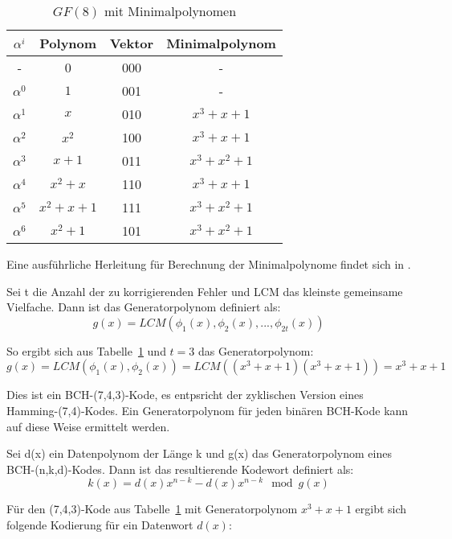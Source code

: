 \begin{table}[!h]
\begin{center}
\begin{tabular}{c|c|c|c}
$\alpha^i$ & Polynom & Vektor & Minimalpolynom\\
\hline
- & 0 & 000 & - \\
$\alpha^0$ & $1$ & 001 & - \\
$\alpha^1$ & $x$ & 010 & $x^3+x+1$ \\
$\alpha^2$ & $x^2$ & 100  & $x^3+x+1$ \\
$\alpha^3$ & $x+1$ & 011  & $x^3+x^2+1$ \\
$\alpha^4$ & $x^2+x$ & 110  & $x^3+x+1$ \\
$\alpha^5$ & $x^2+x+1$ & 111  & $x^3+x^2+1$ \\
$\alpha^6$ & $x^2+1$ & 101  & $x^3+x^2+1$  \\
\end{tabular}
\caption{$GF(8)$ mit Minimalpolynomen}
\label{table:minimals}
\end{center}
\end{table}

Eine ausführliche Herleitung für Berechnung der Minimalpolynome findet sich in \cite[Kap. 3.2.1]{morelos2006art}.

\begin{t_def}
\label{def:genpoly}
Sei t die Anzahl der zu korrigierenden Fehler und LCM das kleinste gemeinsame Vielfache. Dann ist das Generatorpolynom definiert als:
$$g(x) = LCM(\phi_1(x),\phi_2(x),...,\phi_{2t}(x))$$
\end{t_def}

So ergibt sich aus Tabelle~\ref{table:minimals} und $t=3$ das Generatorpolynom:
$$g(x) = LCM(\phi_1(x),\phi_2(x)) = LCM((x^3+x+1)(x^3+x+1)) = x^3+x+1$$

Dies ist ein BCH-(7,4,3)-Kode, es entpsricht der zyklischen Version eines Hamming-(7,4)-Kodes. Ein Generatorpolynom für jeden binären BCH-Kode kann auf diese Weise ermittelt werden.

\begin{t_def}
\label{def:encode}
Sei d(x) ein Datenpolynom der Länge k und g(x) das Generatorpolynom eines BCH-(n,k,d)-Kodes. Dann ist das resultierende Kodewort definiert als:
$$k(x) = d(x)x^{n-k} - d(x)x^{n-k} \mod g(x)$$
\end{t_def}

Für den (7,4,3)-Kode aus Tabelle~\ref{table:minimals} mit Generatorpolynom $x^3+x+1$ ergibt sich folgende Kodierung für ein Datenwort $d(x)$:

